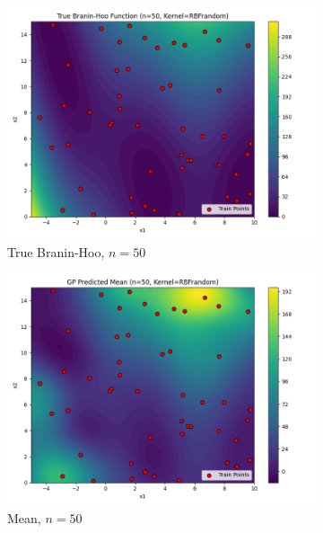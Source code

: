 \documentclass[a4paper,12pt]{article}
\begin{document}
\begin{figure}[H]
\begin{subfigure}{0.3\textwidth}
  \includegraphics[width=\linewidth]{Task-02/images/true_function_rbf_n50_random.png}
  \caption{True Branin-Hoo, $n=50$}
\end{subfigure}
\begin{subfigure}{0.3\textwidth}
    \includegraphics[width=\linewidth]{Task-02/images/gp_mean_rbf_n50_random.png}
    \caption{Mean, $n=50$}
\end{subfigure}
\begin{subfigure}{0.3\textwidth}

\end{subfigure}
\end{figure}
\end{document}
